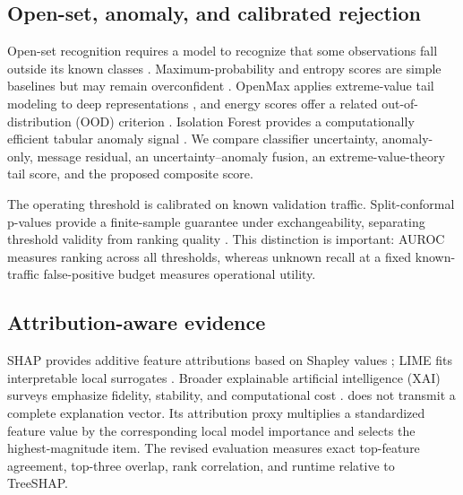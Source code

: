 \subsection{Open-set, anomaly, and calibrated rejection}

Open-set recognition requires a model to recognize that some observations fall outside its known classes \cite{scheirer2013open,geng2021survey}. Maximum-probability and entropy scores are simple baselines but may remain overconfident \cite{hendrycks2017ood}. OpenMax applies extreme-value tail modeling to deep representations \cite{bendale2016openmax}, and energy scores offer a related out-of-distribution (OOD) criterion \cite{liu2020energy}. Isolation Forest provides a computationally efficient tabular anomaly signal \cite{liu2008iforest,chandola2009anomaly}. We compare classifier uncertainty, anomaly-only, message residual, an uncertainty--anomaly fusion, an extreme-value-theory tail score, and the proposed composite score.

The operating threshold is calibrated on known validation traffic. Split-conformal p-values provide a finite-sample guarantee under exchangeability, separating threshold validity from ranking quality \cite{angelopoulos2023conformal}. This distinction is important: AUROC measures ranking across all thresholds, whereas unknown recall at a fixed known-traffic false-positive budget measures operational utility.

\subsection{Attribution-aware evidence}

SHAP provides additive feature attributions based on Shapley values \cite{lundberg2017shap}; LIME fits interpretable local surrogates \cite{ribeiro2016lime}. Broader explainable artificial intelligence (XAI) surveys emphasize fidelity, stability, and computational cost \cite{arrieta2020xai,samek2021xai}. \method{} does not transmit a complete explanation vector. Its attribution proxy multiplies a standardized feature value by the corresponding local model importance and selects the highest-magnitude item. The revised evaluation measures exact top-feature agreement, top-three overlap, rank correlation, and runtime relative to TreeSHAP.

